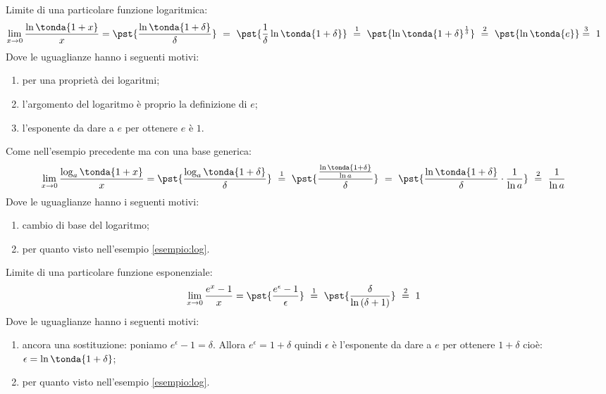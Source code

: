 \begin{esempio}
\label{esempio:log}
Limite di una particolare funzione logaritmica:
\begin{align*}
 \lim_{x \rightarrow 0} \dfrac{\ln\tonda{1+x}}{x} &=
 \pst{\dfrac{\ln\tonda{1+\delta}}{\delta}}~ = ~  
 \pst{\frac{1}{\delta}\ln\tonda{1+\delta}} ~\stackrel{1}{=} ~
 \pst{\ln\tonda{1+\delta}^\frac{1}{\delta}}
~ \stackrel{2}{=} ~
\pst{\ln\tonda{e}} \stackrel{3}{=} ~ 1
\end{align*}
Dove le uguaglianze hanno i seguenti motivi:
\begin{enumerate} [nosep]
 \item per una proprietà dei logaritmi;
 \item l'argomento del logaritmo è proprio la definizione di \(e\);
 \item l'esponente da dare a \(e\) per ottenere \(e\) è \(1\).
\end{enumerate}
\end{esempio}

\begin{esempio}
Come nell'esempio precedente ma con una base generica:
\begin{align*}
 \lim_{x \rightarrow 0} \dfrac{\log_a\tonda{1+x}}{x} &=
 \pst{\dfrac{\log_a\tonda{1+\delta}}{\delta}}~\stackrel{1}{=} ~  
 \pst{\dfrac{\frac{\ln\tonda{1+\delta}}{\ln a}}{\delta}}~= ~
 \pst{\dfrac{\ln\tonda{1+\delta}}{\delta}\cdot \dfrac{1}{\ln a}}
 ~ \stackrel{2}{=} ~
 \dfrac{1}{\ln a}
\end{align*}
Dove le uguaglianze hanno i seguenti motivi:
\begin{enumerate} [nosep]
 \item cambio di base del logaritmo;
 \item per quanto visto nell'esempio \ref{esempio:log}.
\end{enumerate}
\end{esempio}

\begin{esempio}
Limite di una particolare funzione esponenziale:
\begin{align*}
\lim_{x \rightarrow 0} \dfrac{e^x-1}{x} &=
\pst{\dfrac{e^\epsilon-1}{\epsilon}}
~ \stackrel{1}{=} ~  
\pst{\dfrac{\delta}{\ln{(\delta+1)}}}~ \stackrel{2}{=} ~ 1
\end{align*}
Dove le uguaglianze hanno i seguenti motivi:
\begin{enumerate} [nosep]
 \item ancora una sostituzione: poniamo \(e^\epsilon-1=\delta\). 
Allora \(e^\epsilon = 1+\delta\) quindi \(\epsilon\) è l'esponente da dare 
a \(e\) per ottenere \(1+\delta\) cioè: 
\(\epsilon = \ln{\tonda{1+\delta}}\);
 \item per quanto visto nell'esempio \ref{esempio:log}.
\end{enumerate}
\end{esempio}

